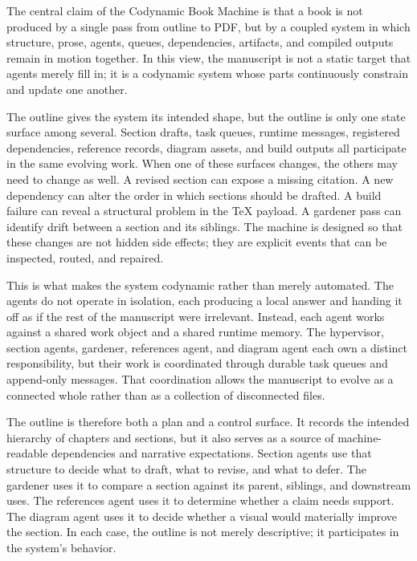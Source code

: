 The central claim of the Codynamic Book Machine is that a book is not produced by a single pass from outline to PDF, but by a coupled system in which structure, prose, agents, queues, dependencies, artifacts, and compiled outputs remain in motion together. In this view, the manuscript is not a static target that agents merely fill in; it is a codynamic system whose parts continuously constrain and update one another.

The outline gives the system its intended shape, but the outline is only one state surface among several. Section drafts, task queues, runtime messages, registered dependencies, reference records, diagram assets, and build outputs all participate in the same evolving work. When one of these surfaces changes, the others may need to change as well. A revised section can expose a missing citation. A new dependency can alter the order in which sections should be drafted. A build failure can reveal a structural problem in the TeX payload. A gardener pass can identify drift between a section and its siblings. The machine is designed so that these changes are not hidden side effects; they are explicit events that can be inspected, routed, and repaired.

This is what makes the system codynamic rather than merely automated. The agents do not operate in isolation, each producing a local answer and handing it off as if the rest of the manuscript were irrelevant. Instead, each agent works against a shared work object and a shared runtime memory. The hypervisor, section agents, gardener, references agent, and diagram agent each own a distinct responsibility, but their work is coordinated through durable task queues and append-only messages. That coordination allows the manuscript to evolve as a connected whole rather than as a collection of disconnected files.

The outline is therefore both a plan and a control surface. It records the intended hierarchy of chapters and sections, but it also serves as a source of machine-readable dependencies and narrative expectations. Section agents use that structure to decide what to draft, what to revise, and what to defer. The gardener uses it to compare a section against its parent, siblings, and downstream uses. The references agent uses it to determine whether a claim needs support. The diagram agent uses it to decide whether a visual would materially improve the section. In each case, the outline is not merely descriptive; it participates in the system's behavior.

